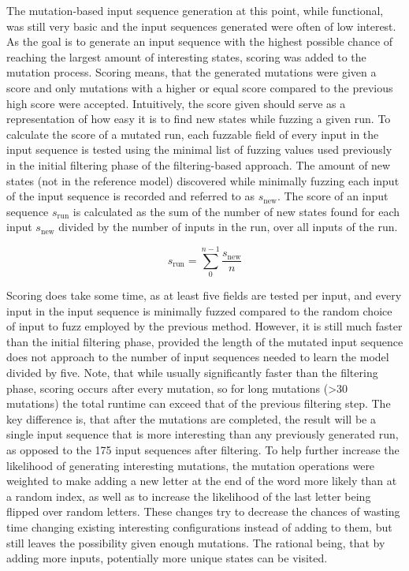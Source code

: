 The mutation-based input sequence generation at this point, while functional, was still very basic and the input sequences generated were often of low interest. As the goal is to generate an input sequence with the highest possible chance of reaching the largest amount of interesting states, scoring was added to the mutation process. Scoring means, that the generated mutations were given a score and only mutations with a higher or equal score compared to the previous high score were accepted. Intuitively, the score given should serve as a representation of how easy it is to find new states while fuzzing a given run. To calculate the score of a mutated run, each fuzzable field of every input in the input sequence is tested using the minimal list of fuzzing values used previously in the initial filtering phase of the filtering-based approach. The amount of new states (not in the reference model) discovered while minimally fuzzing each input of the input sequence is recorded and referred to as $s_\mathrm{new}$. The score of an input sequence $s_\mathrm{run}$ is calculated as the sum of the number of new states found for each input $s_\mathrm{new}$ divided by the number of inputs in the run, over all inputs of the run.

\begin{equation}s_\mathrm{run} = \sum_{0}^{n-1} \frac{s_\mathrm{new}}{n} \end{equation} \label{eq:scoring}

Scoring does take some time, as at least five fields are tested per input, and every input in the input sequence is minimally fuzzed compared to the random choice of input to fuzz employed by the previous method. However, it is still much faster than the initial filtering phase, provided the length of the mutated input sequence does not approach to the number of input sequences needed to learn the model divided by five. Note, that while usually significantly faster than the filtering phase, scoring occurs after every mutation, so for long mutations (>30 mutations) the total runtime can exceed that of the previous filtering step. The key difference is, that after the mutations are completed, the result will be a single input sequence that is more interesting than any previously generated run, as opposed to the 175 input sequences after filtering. To help further increase the likelihood of generating interesting mutations, the mutation operations were weighted to make adding a new letter at the end of the word more likely than at a random index, as well as to increase the likelihood of the last letter being flipped over random letters. These changes try to decrease the chances of wasting time changing existing interesting configurations instead of adding to them, but still leaves the possibility given enough mutations. The rational being, that by adding more inputs, potentially more unique states can be visited. 

